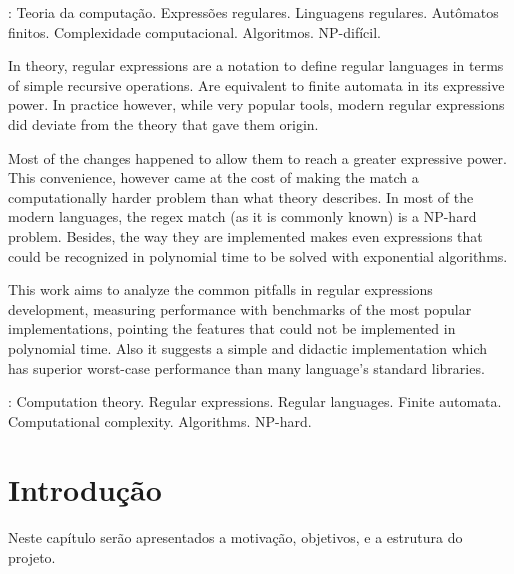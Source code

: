 \documentclass[a4paper,12pt,oneside,onecolumn]{uerj}
\begin{document}
: Teoria da computação. Expressões regulares. Linguagens regulares. Autômatos finitos. Complexidade computacional. Algoritmos. NP-difícil.



In theory, regular expressions are a notation to define regular languages in terms of simple recursive operations. Are equivalent to finite automata in its expressive power. In practice however, while very popular tools, modern regular expressions did deviate from the theory that gave them origin.

Most of the changes happened to allow them to reach a greater expressive power. This convenience, however came at the cost of making the match a computationally harder problem than what theory describes. In most of the modern languages, the regex match (as it is commonly known) is a NP-hard problem. Besides, the way they are implemented makes even expressions that could be recognized in polynomial time to be solved with exponential algorithms.

This work aims to analyze the common pitfalls in regular expressions development, measuring performance with benchmarks of the most popular implementations, pointing the features that could not be implemented in polynomial time. Also it suggests a simple and didactic implementation which has superior worst-case performance than many language's standard libraries.

: Computation theory. Regular expressions. Regular languages. Finite automata. Computational complexity. Algorithms. NP-hard.

\listadefiguras
\lstlistoflistings

\sumario

\mainmatter

\chapter{Introdução}

Neste capítulo serão apresentados a motivação, objetivos, e a estrutura do projeto.

\end{document}
